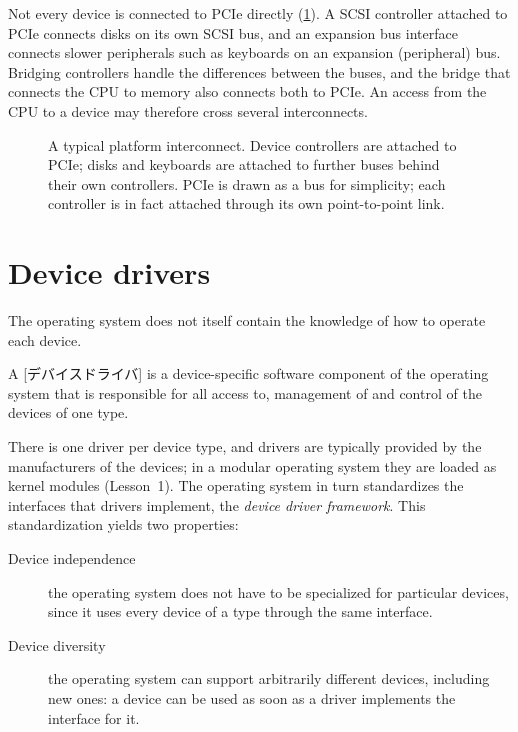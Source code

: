 \documentclass[../main.tex]{subfiles}
\begin{document}
Not every device is connected to PCIe directly (\cref{fig:l11-interconnect}).
A SCSI controller attached to PCIe connects disks on its own SCSI bus, and
an expansion bus interface connects slower peripherals such as keyboards on
an expansion (peripheral) bus.  Bridging controllers handle the differences
between the buses, and the bridge that connects the CPU to memory also
connects both to PCIe.  An access from the CPU to a device may therefore
cross several interconnects.

\begin{figure}[htbp]
  \centering
  
  \caption{A typical platform interconnect.  Device controllers are attached
    to PCIe; disks and keyboards are attached to further buses behind their
    own controllers.  PCIe is drawn as a bus for simplicity; each controller
    is in fact attached through its own point-to-point link.}
  \label{fig:l11-interconnect}
\end{figure}

\section{Device drivers}
\label{sec:l11-drivers}

The operating system does not itself contain the knowledge of how to operate
each device.

\begin{definition}
  A [デバイスドライバ] is a device-specific software
  component of the operating system that is responsible for all access to,
  management of and control of the devices of one type.
\end{definition}

There is one driver per device type, and drivers are typically provided by
the manufacturers of the devices; in a modular operating system they are
loaded as kernel modules (Lesson~1).  The operating system in turn
standardizes the interfaces that drivers implement, the \emph{device driver
framework}.  This standardization yields two properties:
\begin{description}
  \item[Device independence] the operating system does not have to be
    specialized for particular devices, since it uses every device of a type
    through the same interface.
  \item[Device diversity] the operating system can support arbitrarily
    different devices, including new ones: a device can be used as soon as
    a driver implements the interface for it.
\end{description}
\end{document}
